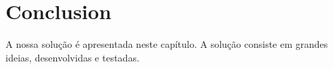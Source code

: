 \chapter{Conclusion} \label{cap:conclusion}

A nossa solução é apresentada neste capítulo. A solução consiste em grandes ideias, desenvolvidas e testadas.
